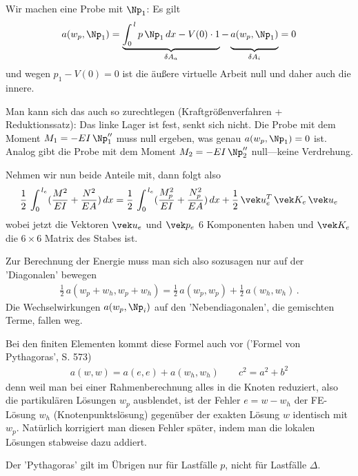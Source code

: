 Wir machen eine Probe mit $\Np_1$: Es gilt
\begin{align}
a(w_p,\Np_1) = \underbrace{\int_0^{\,l} p\,\Np_1\,dx - V(0) \cdot 1}_{\delta A_a} - \underbrace{\vphantom{\int_0^{\,l} }a(w_p,\Np_1)}_{\delta A_i} = 0
\end{align}
und wegen $p_1 - V(0) = 0 $ ist die \"{a}u{\ss}ere virtuelle Arbeit null und daher auch die innere.

Man kann sich das auch so zurechtlegen (Kraftgr\"{o}{\ss}enverfahren + Reduktionssatz): Das linke Lager ist fest, senkt sich nicht. Die Probe mit dem Moment $M_1 = - EI\,\Np_1''$ muss null ergeben, was genau $a(w_p,\Np_1) = 0$ ist. Analog gibt die Probe mit dem Moment $M_2 = - EI\,\Np_2''$ null---keine Verdrehung.

Nehmen wir nun beide Anteile mit, dann folgt also
\begin{align}
\frac{1}{2}\,\int_0^{\,l_e} (\frac{M^2}{EI} + \frac{N^2}{EA})\,dx = \frac{1}{2}\,\int_0^{\,l_e} (\frac{M_p^2}{EI} + \frac{N_p^2}{EA})\,dx + \frac{1}{2}\,\vek u_e^T\,\vek K_e\,\vek u_e
\end{align}
wobei jetzt die Vektoren $\vek u_e$ und $\vek p_e$ 6 Komponenten haben und $\vek K_e$ die $6 \times 6$ Matrix des Stabes ist.

Zur Berechnung der Energie muss man sich also sozusagen nur auf der 'Diagonalen' bewegen
\begin{align}
\frac{1}{2}\, a(w_p + w_h, w_p + w_h) = \frac{1}{2}\,a(w_p,w_p) + \frac{1}{2}\,a(w_h,w_h)\,.
\end{align}
Die Wechselwirkungen $a(w_p,\Np_i)$ auf den 'Nebendiagonalen', die gemischten Terme, fallen weg.

Bei den finiten Elementen kommt diese Formel auch vor ('Formel von Pythagoras', \cite{Ha5} S. 573)
\begin{align}
a(w,w) = a(e,e) + a(w_h,w_h) \qquad c^2 = a^2 + b^2
\end{align}
denn weil man bei einer Rahmenberechnung alles in die Knoten reduziert, also die partikul\"{a}ren L\"{o}sungen $w_p$ ausblendet, ist der Fehler $e = w - w_h$ der FE-L\"{o}sung $w_h$ (Knotenpunktsl\"{o}sung) gegen\"{u}ber der exakten L\"{o}sung $w$ identisch mit $w_p$. Nat\"{u}rlich korrigiert man diesen Fehler sp\"{a}ter, indem man die lokalen L\"{o}sungen stabweise dazu addiert.

Der 'Pythagoras' gilt im \"{U}brigen nur f\"{u}r Lastf\"{a}lle $p$, nicht f\"{u}r Lastf\"{a}lle $\Delta$.



